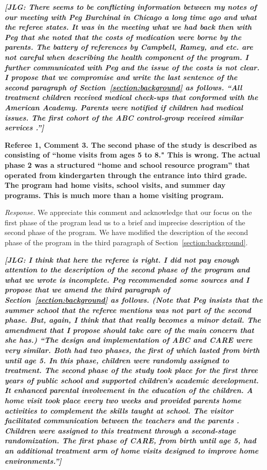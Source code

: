\textit{\textbf{[JLG: There seems to be conflicting information between my notes of our meeting with Peg Burchinal in Chicago a long time ago and what the referee states. It was in the meeting what we had back then with Peg that she noted that the costs of medication were borne by the parents. The battery of references by Campbell, Ramey, and etc. are not careful when describing the health component of the program. I further communicated with Peg and the issue of the costs is not clear. I propose that we compromise and write the last sentence of the second paragraph of Section~\ref{section:background} as follows. ``All treatment children received medical check-ups that conformed with the American Academy. Parents were notified if children had medical issues. The first cohort of the ABC control-group received similar services \citep{Campbell_Conti_etal_2014_EarlyChildhoodInvestments,Henderson-et-al_1982_NEJoM}.'']}}

\noindent \textbf{Referee 1, Comment 3. The second phase of the study is described as consisting of ``home visits from ages 5 to 8." This is wrong. The actual phase 2 was a structured ``home and school resource program'' that operated from kindergarten through the entrance into third grade. The program had home visits, school visits, and summer day programs. This is much more than a home visiting program.}

\noindent \textit{Response.} We appreciate this comment and acknowledge that our focus on the first phase of the program lead us to a brief and imprecise description of the second phase of the program. We have modified the description of the second phase of the program in the third paragraph of Section~\ref{section:background}.

\textit{\textbf{[JLG: I think that here the referee is right. I did not pay enough attention to the description of the second phase of the program and what we wrote is incomplete. Peg recommended some sources and I propose that we amend the third paragraph of Section~\ref{section:background} as follows. (Note that Peg insists that the summer school that the referee mentions was not part of the second phase. But, again, I think that that really becomes a minor detail. The amendment that I propose should take care of the main concern that she has.) ``The design and implementation of ABC and CARE were very similar. Both had two phases, the first of which lasted from birth until age 5. In this phase, children were randomly assigned to treatment. The second phase of the study took place for the first three years of public school and supported children's academic development. It enhanced parental involvement in the education of the children. A home visit took place every two weeks and provided parents home activities to complement the skills taught at school. The visitor facilitated communication between the teachers and the parents \citep{Campbell_Ramey_1995_AERJ}. Children were assigned to this treatment through a second-stage randomization. The first phase of CARE, from birth until age 5, had an additional treatment arm of home visits designed to improve home environments.'']}}  

